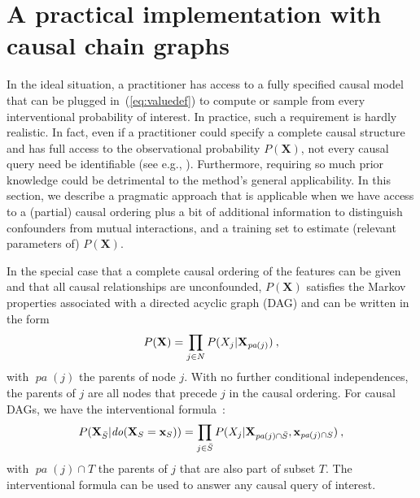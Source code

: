 \documentclass{article}
\newcommand{\vX}{\mathbf{X}}
\newcommand{\vx}{\mathbf{x}}
\newcommand{\dodo}{\mathit{do}}
\newcommand{\lvdo}[1]{\dodo(\vX_{#1} = \vx_{#1})}
\newcommand{\pa}{\mathop{\textit{pa}}}
\newcommand{\spa}{\mathop{\textit{\scriptsize pa}}}
\newcommand{\allfeatures}{{N}}
\begin{document}

\section{A practical implementation with causal chain graphs}

In the ideal situation, a practitioner has access to a fully specified causal model that can be plugged in~(\ref{eq:valuedef}) to compute or sample from every interventional probability of interest. In practice, such a requirement is hardly realistic. In fact, even if a practitioner could specify a complete causal structure  and has full access to the observational probability $P(\vX)$, not every causal query need be identifiable (see e.g., \cite{pearl2012calculus}). Furthermore, requiring so much prior knowledge could be detrimental to the method's general applicability. In this section, we describe a pragmatic approach that is applicable when we have access to a (partial) causal ordering plus a bit of additional information to distinguish confounders from mutual interactions, and a training set to estimate (relevant parameters of) $P(\vX)$.  

In the special case that a complete causal ordering of the features can be given and that all causal relationships are unconfounded, $P(\vX)$ satisfies the Markov properties associated with a directed acyclic graph (DAG) and can be written in the form
\[
P(\vX) = \prod_{j \in \allfeatures} P(X_j|\vX_{\spa(j)}) \: ,
\]
with $\pa(j)$ the parents of node $j$. With no further conditional independences, the parents of $j$ are all nodes that precede $j$ in the causal ordering. For causal DAGs, we have the interventional formula~\cite{lauritzen2002chain}:
\begin{equation}
P(\vX_{\bar{S}}|\lvdo{S}) = \prod_{j \in \bar{S}} P(X_j|\vX_{\spa(j)  \cap \bar{S}},\vx_{\spa(j) \cap S}) \: ,
\label{eq:interventional}
\end{equation}
with $\pa(j) \cap T$ the parents of $j$ that are also part of subset $T$. The interventional formula can be used to answer any causal query of interest.
\end{document}
